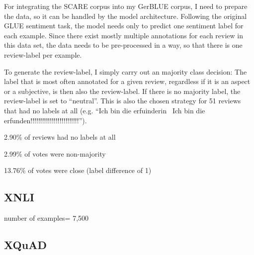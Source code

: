 For integrating the SCARE corpus into my GerBLUE corpus, I need to prepare the data, so it can be handled by the model architecture.
Following the original GLUE sentiment task, the model needs only to predict one sentiment label for each example.
Since there exist mostly multiple annotations for each review in this data set, the data needs to be pre-processed in a way, so that there is one review-label per example.

To generate the review-label, I simply carry out an majority class decision:
The label that is most often annotated for a given review, regardless if it is an aspect or a subjective, is then also the review-label.
If there is no majority label, the review-label is set to ``neutral''.
This is also the chosen strategy for 51 reviews that had no labels at all (e.g. ``Ich bin die erfuinderin \textbar \textbar\ Ich bin die erfunden!!!!!!!!!!!!!!!!!!!!!!!!!'').

2.90\% of reviews had no labels at all 

2.99\% of votes were non-majority

13.76\% of votes were close (label difference of 1)

\subsection{XNLI}

\cite{conneau2018xnli}

number of examples= 7,500

\subsection{XQuAD}

\cite{artetxe2019cross}

